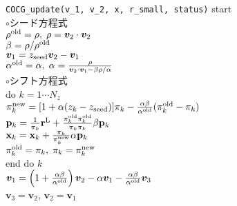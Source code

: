 \documentclass[12pt,titlepage]{jarticle}
\renewenvironment{leftbar}{%
  \def\FrameCommand{\vrule width 1pt \hspace{0pt}}%
  \MakeFramed {\advance\hsize-\width \FrameRestore}}%
 {\endMakeFramed}
\begin{document}
\begin{leftbar}
  \noindent
  \hspace{0.5cm}
  \verb|COCG_update(v_1, v_2, x, r_small, status)| start
  \\\hspace{1.0cm}
  $\circ$シード方程式
  \\\hspace{1.0cm}
  $\rho^{\rm old} = \rho,\; \rho = {\boldsymbol v}_2 \cdot {\boldsymbol v}_2$
  \\\hspace{1.0cm}
  $\beta = \rho / \rho^{\rm old}$
  \\\hspace{1.0cm}
  ${\boldsymbol v}_1 = z_{\rm seed} {\boldsymbol v}_2 - {\boldsymbol v}_1$
  \\\hspace{1.0cm}
  $\alpha^{\rm old} = \alpha,\; 
  \alpha = \frac{\rho}{{\boldsymbol v}_2 \cdot {\boldsymbol v}_1 - \beta \rho / \alpha }$
  \\\hspace{1.0cm}
  $\circ$シフト方程式
  \\\hspace{1.0cm}
  do $k = 1 \cdots N_z$
  \\\hspace{1.5cm}
  $\pi_k^{\rm new} = [1+\alpha(z_k-z_{\rm seed})]\pi_k - \frac{\alpha \beta}{\alpha^{\rm old}}(\pi_k^{\rm old} - \pi_k)$
  \\\hspace{1.5cm}
  ${\bf p}_{k} = \frac{1}{\pi_k} {\bf r}^{\rm L} + 
  \frac{\pi^{\rm old}_k \pi^{\rm old}_k}{\pi_k \pi_k} \beta {\bf p}_{k}$
  \\\hspace{1.5cm}
  ${\bf x}_{k} = {\bf x}_{k} + \frac{\pi_k}{\pi_k^{\rm new}} \alpha {\bf p}_{k}$
  \\\hspace{1.5cm}
  $\pi_k^{\rm old} = \pi_k,\; \pi_k = \pi_k^{\rm new}$
  \\\hspace{1.0cm}
  end do $k$
  \\\hspace{1.0cm}
  ${\boldsymbol v}_1 = \left( 1 + \frac{\alpha \beta}{\alpha^{\rm old}} \right) {\boldsymbol v}_2
  - \alpha {\boldsymbol v}_1 - \frac{\alpha \beta}{\alpha^{\rm old}} {\boldsymbol v}_3$
  \\\hspace{1.0cm}
  ${\boldsymbol v}_3 = {\boldsymbol v}_2$,
  ${\boldsymbol v}_2 = {\boldsymbol v}_1$

\end{leftbar}
\end{document}
